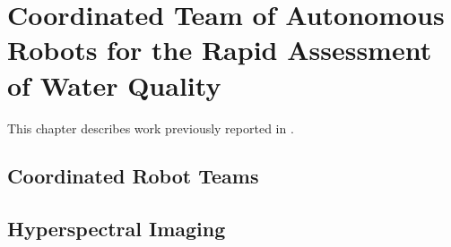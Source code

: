 \chapter{Coordinated Team of Autonomous Robots for the Rapid Assessment of Water
  Quality}\label{ch:robot-team}

This chapter describes work previously reported in \cite{robot-team-1}.


\section{Coordinated Robot Teams}

\section{Hyperspectral Imaging}







